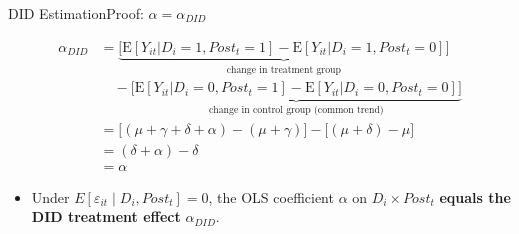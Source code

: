 \documentclass[dvipsnames,hyperref={pdfpagelabels=false}]{beamer}
\begin{document}
\begin{frame}{DID Estimation}{Proof: $\alpha = \alpha_{DID}$}

\begin{align*}
    \alpha_{DID}
    &= \underbrace{\bigl[\mathrm{E}[Y_{it}|D_i=1, Post_t=1] - \mathrm{E}[Y_{it}|D_i=1, Post_t=0]\bigr]}_{\text{change in treatment group}}  \\[4pt]
    &\quad - \underbrace{\bigl[\mathrm{E}[Y_{it}|D_i=0, Post_t=1] - \mathrm{E}[Y_{it}|D_i=0, Post_t=0]\bigr]}_{\text{change in control group (common trend)}} \\[8pt]
    &= \bigl[(\mu+\gamma+\delta+\alpha) - (\mu+\gamma)\bigr]
     - \bigl[(\mu+\delta) - \mu\bigr] \\[4pt]
    &= (\delta + \alpha) - \delta \\[4pt]
    &= \alpha
\end{align*}

\begin{itemize}
    \item  Under $E[\varepsilon_{it} \mid D_i, Post_t] = 0$, the OLS coefficient $\alpha$ on $D_i \times Post_t$ \textbf{equals the DID treatment effect} $\alpha_{DID}$.
\end{itemize}


\end{frame}









\end{document}
